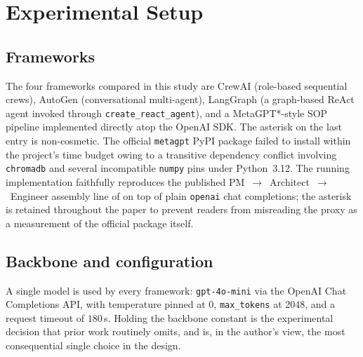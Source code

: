 \documentclass[conference]{IEEEtran}
\begin{document}
\section{Experimental Setup}
\label{sec:setup}

\subsection{Frameworks}
The four frameworks compared in this study are CrewAI (role-based
sequential crews), AutoGen \cite{wu2024autogen} (conversational
multi-agent), LangGraph (a graph-based ReAct agent invoked through
\texttt{create\_react\_agent}), and a MetaGPT*-style SOP pipeline
implemented directly atop the OpenAI SDK. The asterisk on the last
entry is non-cosmetic. The official \texttt{metagpt} PyPI package
failed to install within the project's time budget owing to a
transitive dependency conflict involving \texttt{chromadb} and
several incompatible \texttt{numpy} pins under Python~3.12. The
running implementation faithfully reproduces the published
PM~$\rightarrow$~Architect~$\rightarrow$~Engineer assembly line of
\cite{hong2024metagpt} on top of plain \texttt{openai} chat
completions; the asterisk is retained throughout the paper to prevent
readers from misreading the proxy as a measurement of the official
package itself.

\subsection{Backbone and configuration}
A single model is used by every framework: \texttt{gpt-4o-mini} via
the OpenAI Chat Completions API, with temperature pinned at 0,
\texttt{max\_tokens} at 2048, and a request timeout of $180\,$s.
Holding the backbone constant is the experimental decision that prior
work routinely omits, and is, in the author's view, the most
consequential single choice in the design.
\end{document}
